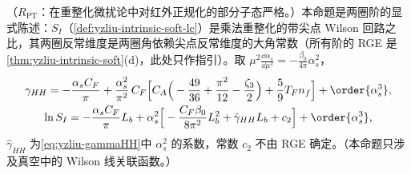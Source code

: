 \begin{proposition}\label{prop:yzliu-sI-twoloop}
（$R_{\mathrm{PT}}$：在重整化微扰论中对红外正规化的部分子态严格。）本命题是两圈阶的显式陈述：$S_I$（\cref{def:yzliu-intrinsic-soft-lc}）是乘法重整化的带尖点 Wilson 回路之比，其两圈反常维度是两圈角依赖尖点反常维度的大角常数（所有阶的 RGE 是\cref{thm:yzliu-intrinsic-soft}(d)，此处只作指引）。取 $\mu^2\frac{\dd\alpha_s}{\dd\mu^2}=-\frac{\beta_0}{4\pi}\alpha_s^2$，%
\begin{gather}
\gamma_{HH}=-\frac{\alpha_sC_F}{\pi}+\frac{\alpha_s^2}{\pi^2}\,C_F\Big[C_A\Big(-\frac{49}{36}+\frac{\pi^2}{12}-\frac{\zeta_3}{2}\Big)+\frac59T_Fn_f\Big]+\order{\alpha_s^3},\label{eq:yzliu-gammaHH}\\
\ln S_I=-\frac{\alpha_sC_F}{\pi}L_b+\alpha_s^2\Big[-\frac{C_F\beta_0}{8\pi^2}L_b^2+\hat\gamma_{HH}L_b+c_2\Big]+\order{\alpha_s^3},\label{eq:yzliu-lnSI-2loop}
\end{gather}
$\hat\gamma_{HH}$ 为\cref{eq:yzliu-gammaHH}中 $\alpha_s^2$ 的系数，常数 $c_2$ 不由 RGE 确定。（本命题只涉及真空中的 Wilson 线关联函数。）
\end{proposition}

